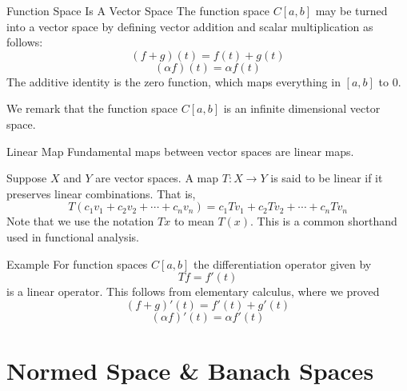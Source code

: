 \documentclass[10pt]{beamer}
\begin{document}
		\begin{frame}{Function Space Is A Vector Space}
				The function space $C[a,b]$ may be turned into a vector space by defining vector addition and scalar multiplication as follows: 
				\begin{equation*}
						(f+g)(t) = f(t) + g(t) 
				\end{equation*}
				\begin{equation*}
						(\alpha f)(t) = \alpha f(t)
				\end{equation*}
				The additive identity is the zero function, which maps everything in $[a,b]$ to 0. 

				\begin{block}{}
						We remark that the function space $C[a,b]$ is an infinite dimensional vector space. 
				\end{block}
		\end{frame}

		\begin{frame}{Linear Map}
				Fundamental maps between vector spaces are linear maps. 
				\begin{definition}
						Suppose $X$ and $Y$ are vector spaces. A map $T: X\to Y$ is said to be \alert{linear} if it preserves linear combinations. That is, 
						\begin{equation*}
								T(c_1v_1 + c_2v_2 + \cdots + c_nv_n) = c_1Tv_1 + c_2Tv_2 + \cdots + c_nTv_n
						\end{equation*}
						Note that we use the notation $Tx$ to mean $T(x)$. This is a common shorthand used in functional analysis.
				\end{definition}
		\end{frame}

		\begin{frame}{Example}
				For function spaces $C[a,b]$ the differentiation operator given by 
				\begin{equation*}
						Tf = f'(t)
				\end{equation*}
				is a linear operator. This follows from elementary calculus, where we proved 
				\begin{equation*}
						(f+g)'(t) = f'(t) + g'(t) 
				\end{equation*}
				\begin{equation*}
						(\alpha f)'(t) = \alpha f'(t)
				\end{equation*}
		\end{frame}

		\section{Normed Space \& Banach Spaces}
\end{document}
